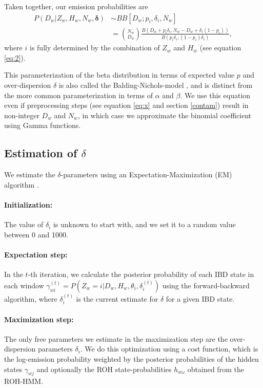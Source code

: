 \documentclass[12pt, letterpaper]{article}
\begin{document}
Taken together, our emission probabilities are
\begin{align}\label{eq:3}
P(D_{w}|Z_w,H_w,N_w, \bm{\delta}) &\sim BB[D_w; p_i, \delta_i, N_w] \nonumber\\
&= \binom{N_w}{D_w}\frac{B(D_w+p_i \delta_{i}, N_w-D_w+ \delta_{i}(1-p_{i}))}{ B(p_{i}\delta_{i}, (1-p_{i})\delta_{i})},
\end{align}
where $i$ is fully determined by the combination of $Z_w$ and $H_w$ (see equation \ref{eq:2}).

This parameterization of the beta distribution in terms of expected value $p$ and over-dispersion $\delta$ is also called the Balding-Nichols-model \cite{balding_method_nodate}, and is distinct from the more common parameterization in terms of $\alpha$ and $\beta$. We use this equation even if preprocessing steps (see equation \ref{eq:x} and section \ref{contam}) result in non-integer $D_w$ and $N_w$, in which case we approximate the binomial coefficient using Gamma functions.

\subsection{Estimation of \texorpdfstring{$\delta$}{}}\label{delta}
We estimate the $\delta$-parameters using an Expectation-Maximization (EM) algorithm \cite{dempster_maximum_1977}.

\paragraph{Initialization:}
The value of $\delta_i$ is unknown to start with, and we set it to a random value between 0 and 1000.

\paragraph{Expectation step:}
In the $t$-th iteration, we calculate the posterior probability of each IBD state in each window $\gamma^{(t)}_{wi} = P(Z_w=i | D_w, H_w, \theta_i, \delta_i^{(t)})$ using the forward-backward algorithm, where $\delta_i^{(t)}$ is the current estimate for $\delta$ for a given IBD state.

\paragraph{Maximization step:}
The only free parameters we estimate in the maximization step are the over-dispersion parameters $\delta_i$. We do this optimization using a cost function, which is the log-emission probability weighted by the posterior probabilities of the hidden states $\gamma_{wj}$ and optionally the ROH state-probabilities $h_{w\omega}$ obtained from the ROH-HMM.
\end{document}
